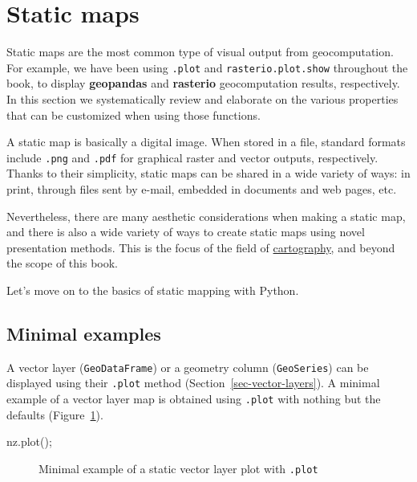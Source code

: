 \documentclass[
  letterpaper,
]{krantz}
\newenvironment{Shaded}{\begin{snugshade}}{\end{snugshade}}
\newcommand{\NormalTok}[1]{\textcolor[rgb]{0.00,0.23,0.31}{#1}}
\newcommand{\OperatorTok}[1]{\textcolor[rgb]{0.37,0.37,0.37}{#1}}
\begin{document}
\section{Static maps}\label{sec-static-maps}

Static maps are the most common type of visual output from
geocomputation. For example, we have been using \texttt{.plot} and
\texttt{rasterio.plot.show} throughout the book, to display
\textbf{geopandas} and \textbf{rasterio} geocomputation results,
respectively. In this section we systematically review and elaborate on
the various properties that can be customized when using those
functions.

A static map is basically a digital image. When stored in a file,
standard formats include \texttt{.png} and \texttt{.pdf} for graphical
raster and vector outputs, respectively. Thanks to their simplicity,
static maps can be shared in a wide variety of ways: in print, through
files sent by e-mail, embedded in documents and web pages, etc.

Nevertheless, there are many aesthetic considerations when making a
static map, and there is also a wide variety of ways to create static
maps using novel presentation methods. This is the focus of the field of
\href{https://en.wikipedia.org/wiki/Cartography}{cartography}, and
beyond the scope of this book.

Let's move on to the basics of static mapping with Python.

\subsection{Minimal examples}\label{minimal-examples}

A vector layer (\texttt{GeoDataFrame}) or a geometry column
(\texttt{GeoSeries}) can be displayed using their \texttt{.plot} method
(Section~\ref{sec-vector-layers}). A minimal example of a vector layer
map is obtained using \texttt{.plot} with nothing but the defaults
(Figure~\ref{fig-vector-minimal}).

\begin{Shaded}
\begin{Highlighting}[]
\NormalTok{nz.plot()}\OperatorTok{;}
\end{Highlighting}
\end{Shaded}

\begin{figure}[H]


\caption{\label{fig-vector-minimal}Minimal example of a static vector
layer plot with \texttt{.plot}}

\end{figure}%
\end{document}
